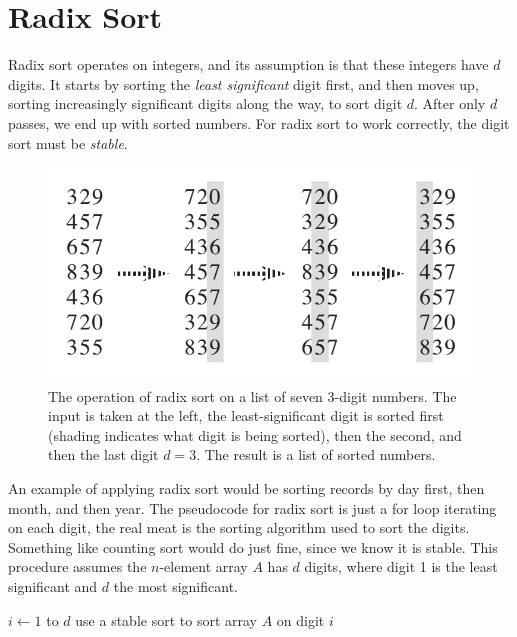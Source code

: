 \documentclass[12pt]{article}
\begin{document}
\newpage

\section*{Radix Sort}
Radix sort operates on integers, and its assumption is that these integers have $d$ digits. It starts by sorting the \textit{least significant} digit first, and then moves up, sorting increasingly significant digits along the way, to sort digit $d$. After only $d$ passes, we end up with sorted numbers. For radix sort to work correctly, the digit sort must be \textit{stable}.

\begin{figure}[!ht]
\includegraphics[scale=0.4]{radix_sort}
\caption{
    The operation of radix sort on a list of seven 3-digit numbers. The input is taken at the left, the least-significant digit is sorted first (shading indicates what digit is being sorted), then the second, and then the last digit $d=3$. The result is a list of sorted numbers.
}
\label{fig:linear_rs}
\end{figure}

An example of applying radix sort would be sorting records by day first, then month, and then year. The pseudocode for radix sort is just a for loop iterating on each digit, the real meat is the sorting algorithm used to sort the digits. Something like counting sort would do just fine, since we know it is stable. This procedure assumes the $n$-element array $A$ has $d$ digits, where digit 1 is the least significant and $d$ the most significant.

\begin{codebox}
\li \For $i \gets 1$ to $d$
\li \Do
        use a stable sort to sort array $A$ on digit $i$
    \End
\end{codebox}
\end{document}
